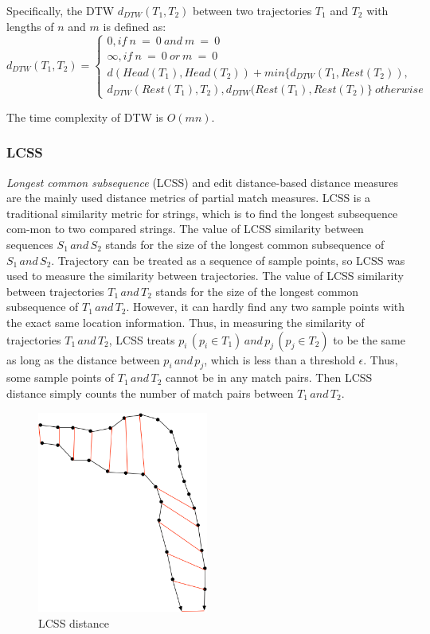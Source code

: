 \documentclass[a4paper, 12pt]{article}
\newcommand{\myequations}[1]{
   \addcontentsline{equ}{myequations}{\protect\numberline{\theequation}#1}
}
\begin{document}
Specifically, the DTW $d_{DTW} (T_{1},T_{2})$ between two trajectories $T_{1}$ and $T_{2}$ with lengths of $n$ and $m$ is defined as:
\begin{equation} \label{eq2}
    d_{DTW} (T_{1},T_{2}) = \begin{cases}
                                0, if\:n\:=\:0\:and\:m\:=\:0 \\
                                \infty, if\:n\:=\:0\:or\:m\:=\:0 \\
                                d(Head(T_{1}), Head(T_{2})) + min\{d_{DTW}(T_{1}, Rest(T_{2})), \\ d_{DTW}(Rest(T_{1}), T_{2}), d_{DTW}(Rest(T_{1}), Rest(T_{2}) \} \: otherwise
                            \end{cases}
\end{equation}
\myequations{DTW distance}
The time complexity of DTW is $O(mn)$.

\subsubsection{LCSS}
\textit{Longest common subsequence} (LCSS) and edit distance-based distance measures are the mainly used distance metrics of partial match measures. LCSS is a traditional similarity metric for strings, which is to find the longest subsequence com-mon to two compared strings. The value of LCSS similarity between sequences $S_{1}\,and\,S_{2}$ stands for the size of the longest common subsequence of $S_{1}\,and\,S_{2}$. Trajectory can be treated as a sequence of sample points, so LCSS was used to measure the similarity between trajectories. The value of LCSS similarity between trajectories $T_{1}\,and\,T_{2}$ stands for the size of the longest common subsequence of $T_{1}\,and\,T_{2}$. However, it can hardly find any two sample points with the exact same location information. Thus, in measuring the similarity of trajectories $T_{1}\,and\,T_{2}$, LCSS treats $p_{i}\,(p_{i} \in T_{1})\,and\,p_{j}\,(p_{j} \in T_{2})$ to be the same as long as the distance between $p_{i}\,and\,p_{j}$, which is less than a threshold $\epsilon$. Thus, some sample points of $T_{1}\,and\,T_{2}$ cannot be in any match pairs. Then LCSS distance simply counts the number of match pairs between $T_{1}\,and\,T_{2}$. 

\begin{figure}[ht]
    \centering
    \includegraphics[width=0.5\textwidth]{LCSS.png}
    \caption{LCSS distance}
\end{figure}
\end{document}
